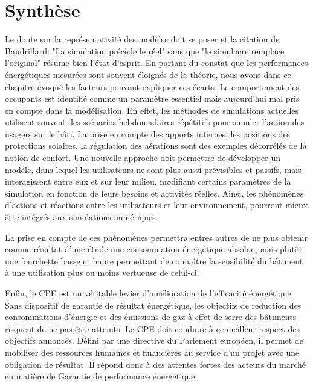 \section{Synthèse}

Le doute sur la représentativité des modèles doit se poser et la citation de Baudrillard: "La simulation précède le réel" sans que "le simulacre remplace l'original" résume bien l'état d'esprit. En partant du constat que les performances énergétiques mesurées sont souvent éloignés de la théorie, nous avons dans ce chapitre évoqué les facteurs pouvant expliquer ces écarts. Le comportement des occupants est identifié comme un paramètre essentiel mais aujourd'hui mal pris en compte dans la modélisation. En effet, les méthodes de simulations actuelles utilisent souvent des scénarios hebdomadaires répétitifs pour simuler l'action des usagers sur le bâti. La prise en compte des apports internes, les positions des protections solaires, la régulation des aérations sont des exemples décorrélés de la notion de confort. Une nouvelle approche doit permettre de développer un modèle, dans lequel les utilisateurs ne sont plus aussi prévisibles et passifs, mais interagissent entre eux et sur leur milieu, modifiant certains paramètres de la simulation en fonction de leurs besoins et activités réelles. Ainsi, les phénomènes d'actions et réactions entre les utilisateurs et leur environnement, pourront mieux être intégrés aux simulations numériques.

La prise en compte de ces phénomènes permettra entres autres de ne plus obtenir comme résultat d'une étude une consommation énergétique absolue, mais plutôt une fourchette basse et haute permettant de connaître la sensibilité du bâtiment à une utilisation plus ou moins vertueuse de celui-ci.

Enfin, le CPE est un véritable levier d'amélioration de l'efficacité énergétique. Sans dispositif de garantie de résultat énergétique, les objectifs de réduction des consommations d'énergie et des émissions de gaz à effet de serre des bâtiments risquent de ne pas être atteints. Le CPE doit conduire à ce meilleur respect des objectifs annoncés. Défini par une directive du Parlement européen, il permet de mobiliser des ressources humaines et financières au service d'un projet avec une obligation de résultat. Il répond donc à des attentes fortes des acteurs du marché en matière de Garantie de performance énergétique.